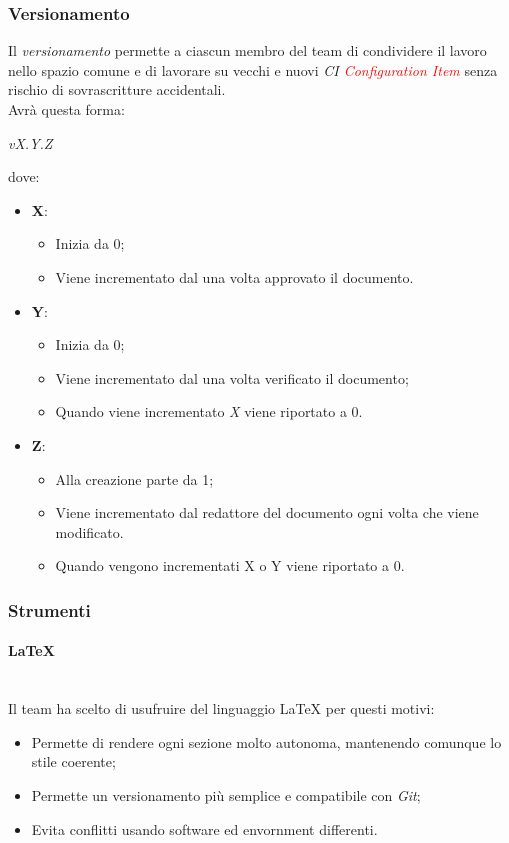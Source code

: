 \subsubsection{Versionamento}
Il \emph{versionamento} permette a ciascun membro del team di condividere il lavoro nello spazio comune e di lavorare su vecchi e nuovi \emph{CI \textcolor{red}{Configuration Item}} senza rischio di sovrascritture accidentali.
\\Avrà questa forma:
\begin{center}
	\emph{vX.Y.Z}
\end{center}
dove:
\begin{itemize}
	\item \textbf{X}:
	\begin{itemize}
		\item Inizia da 0;
		\item Viene incrementato dal \RdP{} una volta approvato il documento.
	\end{itemize}
	\item \textbf{Y}:
	\begin{itemize}
		\item Inizia da 0;
		\item Viene incrementato dal \ver{} una volta verificato il documento;
		\item Quando viene incrementato \emph{X} viene riportato a 0.
	\end{itemize}
	\item \textbf{Z}:
	\begin{itemize}
		\item Alla creazione parte da 1;
		\item Viene incrementato dal redattore del documento ogni volta che viene modificato.
		\item Quando vengono incrementati X o Y viene riportato a 0.
	\end{itemize}
\end{itemize}
\subsubsection{Strumenti}
\paragraph{\textbf{\LaTeX}}
~\\Il team ha scelto di usufruire del linguaggio \LaTeX{} per questi motivi:
\begin{itemize}
	\item Permette di rendere ogni sezione molto autonoma, mantenendo comunque lo stile coerente;
	\item Permette un versionamento più semplice e compatibile con \emph{Git};
	\item Evita conflitti usando software ed envornment differenti.
\end{itemize}
